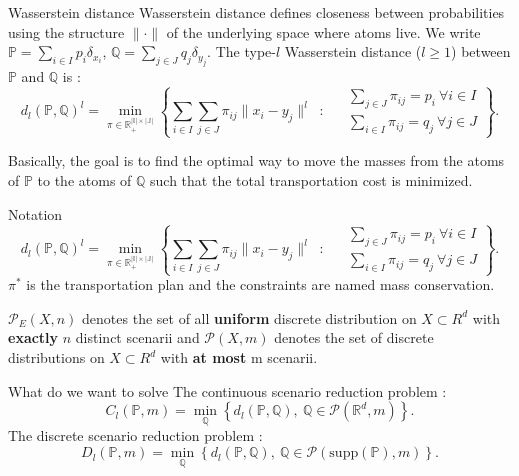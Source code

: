 \documentclass{beamer}
\theoremstyle{plain}
\begin{document}
\begin{frame}{Wasserstein distance}
 Wasserstein distance defines closeness between probabilities using the structure $\lVert \cdot\rVert$ of the underlying space where atoms live. We write $\mathbb{P}=\sum_{i\in I}p_i\delta_{x_i}$, $\mathbb{Q}=\sum_{j\in J }q_j\delta_{y_j}$. The type-$l$ Wasserstein distance ($l\geq1$) between $\mathbb{P}$ and $\mathbb{Q}$ is : 
 \[
d_l(\mathbb{P},\mathbb{Q})^l=\min_{\pi\in\mathbb{R_+^{|I|\times|J|}}}\left\{ 
\sum_{i\in I}\sum_{j\in J}\pi_{ij}\lVert x_i-y_j\rVert^l \: \text{ : } \:  \begin{aligned}
& \sum_{j\in J}\pi_{ij}=p_i \: \forall i\in I \\
& \sum_{i\in I}\pi_{ij}=q_j \: \forall j\in J
\end{aligned}\right\}.
\]
\newline

Basically, the goal is to find the optimal way to move the masses from the atoms of $\mathbb{P}$ to the atoms of $\mathbb{Q}$ such that the total transportation cost is minimized.
\end{frame}

\begin{frame}{Notation}
\[
d_l(\mathbb{P},\mathbb{Q})^l=\min_{\pi\in\mathbb{R_+^{|I|\times|J|}}}\left\{ 
\sum_{i\in I}\sum_{j\in J}\pi_{ij}\lVert x_i-y_j\rVert^l \: \text{ : } \:  \begin{aligned}
& \sum_{j\in J}\pi_{ij}=p_i \: \forall i\in I \\
& \sum_{i\in I}\pi_{ij}=q_j \: \forall j\in J
\end{aligned}\right\}.
\]
    $\pi^*$ is the transportation plan and the constraints are named mass conservation.
    \newline
    
    $\mathcal{P}_E(X,n)$ denotes the set of all \textbf{uniform} discrete distribution on $X\subset R^d$ with \textbf{exactly} $n$ distinct scenarii and $\mathcal{P}(X,m)$ denotes the set of discrete distributions on $X\subset R^d$ with \textbf{at most} m scenarii. 
\end{frame}

\begin{frame}{What do we want to solve}
    The continuous scenario reduction problem : 
$$
C_l(\mathbb{P},m)=\min_\mathbb{Q}\left\{d_l(\mathbb{P},\mathbb{Q}),\: \mathbb{Q}\in\mathcal{P}(\mathbb{R}^d,m)\right\}. 
$$
The discrete scenario reduction problem :
$$
D_l(\mathbb{P},m)=\min_\mathbb{Q}\left\{d_l(\mathbb{P},\mathbb{Q}),\: \mathbb{Q}\in\mathcal{P}(\text{supp}(\mathbb{P}),m)\right\}.
$$
\end{frame}
\end{document}
